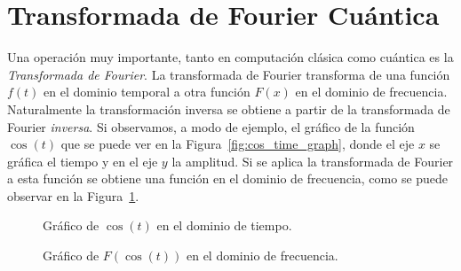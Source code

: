\section{Transformada de Fourier Cuántica}
Una operación muy importante, tanto en computación clásica como cuántica es la \emph{Transformada de Fourier}. La transformada de Fourier transforma de una función $f(t)$ en el dominio temporal a otra función  $F(x)$ en el dominio de frecuencia. Naturalmente la transformación inversa se obtiene a partir de la transformada de Fourier \emph{inversa}. Si observamos, a modo de ejemplo, el gráfico de la función $\cos(t)$ que se puede ver en la Figura~\ref{fig:cos_time_graph}, 
donde el eje $x$ se gráfica el tiempo y en el eje $y$ la amplitud. Si se aplica la transformada de Fourier a esta función se obtiene una función en el dominio de frecuencia, como se puede observar en la Figura~\ref{fig:cos_freq_graph}.
\begin{figure}[ht]
  \centering
  \begin{multicols}{2}
    \caption{Gráfico de $\cos(t)$ en el dominio de tiempo.}
    \label{fig:cos_time_graph}

    \caption{Gráfico de $F(\cos(t))$ en el dominio de frecuencia.}
    \label{fig:cos_freq_graph}
  \end{multicols}
\end{figure}


